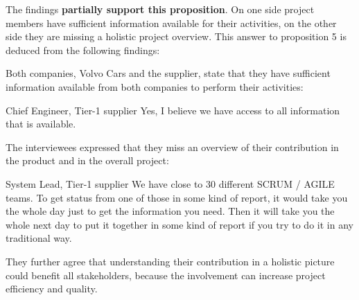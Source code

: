 The findings {\bf partially support this proposition}. On one side project members have sufficient information available for their activities, on the other side they are missing a holistic project overview. This answer to proposition 5 is deduced from the following findings:

 Both companies, Volvo Cars and the supplier, state that they have sufficient information available from both companies to perform their activities:

\begin{aquote}{Chief Engineer, Tier-1 supplier}
Yes, I believe we have access to all information that is available.
\end{aquote}

 The interviewees expressed that they miss an overview of their contribution in the product and in the overall project:



\begin{aquote}{System Lead, Tier-1 supplier}
We have close to 30 different SCRUM / AGILE teams. To get status from one of those in some kind of report, it would take you the whole day just to get the information you need. Then it will take you the whole next day to put it together in some kind of report if you try to do it in any traditional way. 
\end{aquote}

They further agree that understanding their contribution in a holistic picture could benefit all stakeholders, because the involvement can increase project efficiency and quality.




